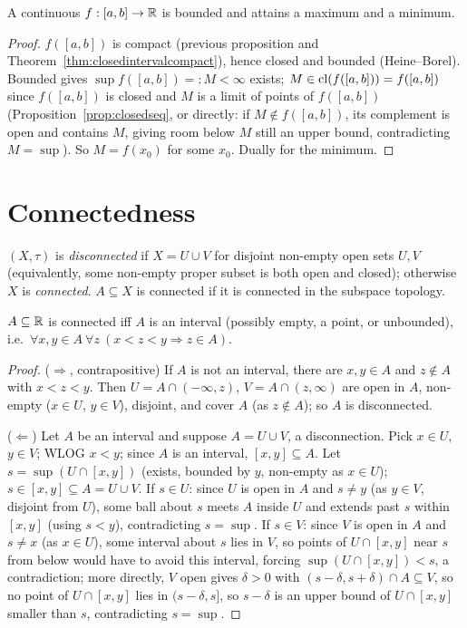 \begin{corollary}
	A continuous $f:[a,b]\to\mathbb{R}$ is bounded and attains a maximum and a minimum.
\end{corollary}
\begin{proof}
	$f([a,b])$ is compact (previous proposition and Theorem~\ref{thm:closedintervalcompact}), hence closed and bounded (Heine--Borel). Bounded gives $\sup f([a,b])=:M<\infty$ exists; $M\in\operatorname{cl}(f([a,b]))=f([a,b])$ since $f([a,b])$ is closed and $M$ is a limit of points of $f([a,b])$ (Proposition~\ref{prop:closedseq}, or directly: if $M\notin f([a,b])$, its complement is open and contains $M$, giving room below $M$ still an upper bound, contradicting $M=\sup$). So $M=f(x_0)$ for some $x_0$. Dually for the minimum.
\end{proof}

\section{Connectedness}

\begin{definition}
	$(X,\tau)$ is \emph{disconnected} if $X=U\cup V$ for disjoint non-empty open sets $U,V$ (equivalently, some non-empty proper subset is both open and closed); otherwise $X$ is \emph{connected}. $A\subseteq X$ is connected if it is connected in the subspace topology.
\end{definition}

\begin{theorem}\label{thm:intervalsconnected}
	$A\subseteq\mathbb{R}$ is connected iff $A$ is an interval (possibly empty, a point, or unbounded), i.e.\ $\forall x,y\in A\ \forall z\ (x<z<y\Rightarrow z\in A)$.
\end{theorem}
\begin{proof}
	($\Rightarrow$, contrapositive) If $A$ is not an interval, there are $x,y\in A$ and $z\notin A$ with $x<z<y$. Then $U=A\cap(-\infty,z)$, $V=A\cap(z,\infty)$ are open in $A$, non-empty ($x\in U$, $y\in V$), disjoint, and cover $A$ (as $z\notin A$); so $A$ is disconnected.
	
	($\Leftarrow$) Let $A$ be an interval and suppose $A=U\cup V$, a disconnection. Pick $x\in U$, $y\in V$; WLOG $x<y$; since $A$ is an interval, $[x,y]\subseteq A$. Let $s=\sup(U\cap[x,y])$ (exists, bounded by $y$, non-empty as $x\in U$); $s\in[x,y]\subseteq A=U\cup V$. If $s\in U$: since $U$ is open in $A$ and $s\ne y$ (as $y\in V$, disjoint from $U$), some ball about $s$ meets $A$ inside $U$ and extends past $s$ within $[x,y]$ (using $s<y$), contradicting $s=\sup$. If $s\in V$: since $V$ is open in $A$ and $s\ne x$ (as $x\in U$), some interval about $s$ lies in $V$, so points of $U\cap[x,y]$ near $s$ from below would have to avoid this interval, forcing $\sup(U\cap[x,y])<s$, a contradiction; more directly, $V$ open gives $\delta>0$ with $(s-\delta,s+\delta)\cap A\subseteq V$, so no point of $U\cap[x,y]$ lies in $(s-\delta,s]$, so $s-\delta$ is an upper bound of $U\cap[x,y]$ smaller than $s$, contradicting $s=\sup$.
\end{proof}

